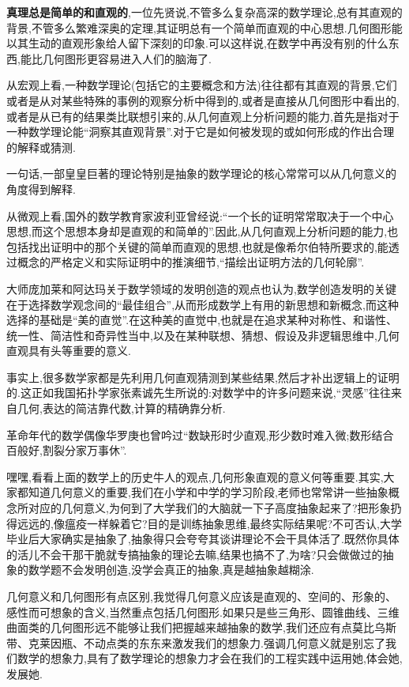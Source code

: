 \textbf{真理总是简单的和直观的},一位先贤说,不管多么复杂高深的数学理论,总有其直观的背景,不管多么繁难深奥的定理,其证明总有一个简单而直观的中心思想.几何图形能以其生动的直观形象给人留下深刻的印象.可以这样说,在数学中再没有别的什么东西,能比几何图形更容易进入人们的脑海了.

从宏观上看,一种数学理论(包括它的主要概念和方法)往往都有其直观的背景,它们或者是从对某些特殊的事例的观察分析中得到的,或者是直接从几何图形中看出的,或者是从已有的结果类比联想引来的,从几何直观上分析问题的能力,首先是指对于一种数学理论能``洞察其直观背景''.对于它是如何被发现的或如何形成的作出合理的解释或猜测.

一句话,一部皇皇巨著的理论特别是抽象的数学理论的核心常常可以从几何意义的角度得到解释.

从微观上看,国外的数学教育家波利亚曾经说:``一个长的证明常常取决于一个中心思想,而这个思想本身却是直观的和简单的''.因此,从几何直观上分析问题的能力,也包括找出证明中的那个关键的简单而直观的思想,也就是像希尔伯特所要求的,能透过概念的严格定义和实际证明中的推演细节,``描绘出证明方法的几何轮廓''.

大师庞加莱和阿达玛关于数学领域的发明创造的观点也认为,数学创造发明的关键在于选择数学观念间的``最佳组合'',从而形成数学上有用的新思想和新概念,而这种选择的基础是``美的直觉''.在这种美的直觉中,也就是在追求某种对称性、和谐性、统一性、简洁性和奇异性当中,以及在某种联想、猜想、假设及非逻辑思维中,几何直观具有头等重要的意义.

事实上,很多数学家都是先利用几何直观猜测到某些结果,然后才补出逻辑上的证明的.这正如我国拓扑学家张素诚先生所说的:对数学中的许多问题来说,``灵感''往往来自几何,表达的简洁靠代数,计算的精确靠分析.

革命年代的数学偶像华罗庚也曾吟过``数缺形时少直观,形少数时难入微;数形结合百般好,割裂分家万事休''.

嘿嘿,看看上面的数学上的历史牛人的观点,几何形象直观的意义何等重要.其实,大家都知道几何意义的重要,我们在小学和中学的学习阶段,老师也常常讲一些抽象概念所对应的几何意义,为何到了大学我们的大脑就一下子高度抽象起来了?把形象扔得远远的,像瘟疫一样躲着它?目的是训练抽象思维,最终实际结果呢?不可否认,大学毕业后大家确实是抽象了,抽象得只会夸夸其谈讲理论不会干具体活了.既然你具体的活儿不会干那干脆就专搞抽象的理论去嘛,结果也搞不了,为啥?只会做做过的抽象的数学题不会发明创造,没学会真正的抽象,真是越抽象越糊涂.

几何意义和几何图形有点区别,我觉得几何意义应该是直观的、空间的、形象的、感性而可想象的含义,当然重点包括几何图形.如果只是些三角形、圆锥曲线、三维曲面类的几何图形远不能够让我们把握越来越抽象的数学,我们还应有点莫比乌斯带、克莱因瓶、不动点类的东东来激发我们的想象力.强调几何意义就是别忘了我们数学的想象力,具有了数学理论的想象力才会在我们的工程实践中运用她,体会她,发展她.

